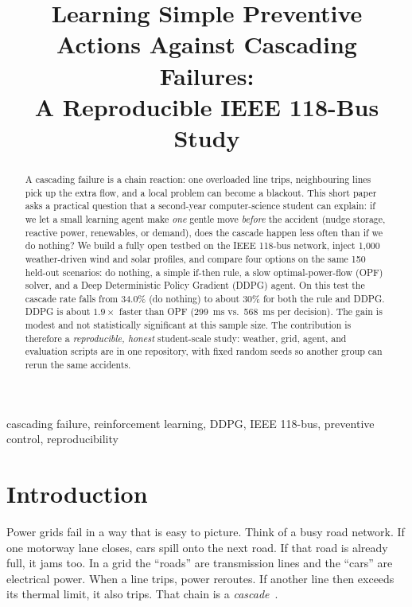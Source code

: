\documentclass[conference]{IEEEtran}
\begin{document}
\title{Learning Simple Preventive Actions Against Cascading Failures:\\
A Reproducible IEEE 118-Bus Study}

\author{
}

\maketitle

\begin{abstract}
A cascading failure is a chain reaction: one overloaded line trips, neighbouring lines pick up the extra flow, and a local problem can become a blackout. This short paper asks a practical question that a second-year computer-science student can explain: if we let a small learning agent make \emph{one} gentle move \emph{before} the accident (nudge storage, reactive power, renewables, or demand), does the cascade happen less often than if we do nothing? We build a fully open testbed on the IEEE 118-bus network, inject 1{,}000 weather-driven wind and solar profiles, and compare four options on the same 150 held-out scenarios: do nothing, a simple if-then rule, a slow optimal-power-flow (OPF) solver, and a Deep Deterministic Policy Gradient (DDPG) agent. On this test the cascade rate falls from 34.0\% (do nothing) to about 30\% for both the rule and DDPG. DDPG is about $1.9\times$ faster than OPF (299~ms vs.\ 568~ms per decision). The gain is modest and not statistically significant at this sample size. The contribution is therefore a \emph{reproducible, honest} student-scale study: weather, grid, agent, and evaluation scripts are in one repository, with fixed random seeds so another group can rerun the same accidents.
\end{abstract}

\begin{IEEEkeywords}
cascading failure, reinforcement learning, DDPG, IEEE 118-bus, preventive control, reproducibility
\end{IEEEkeywords}

\section{Introduction}

Power grids fail in a way that is easy to picture. Think of a busy road network. If one motorway lane closes, cars spill onto the next road. If that road is already full, it jams too. In a grid the ``roads'' are transmission lines and the ``cars'' are electrical power. When a line trips, power reroutes. If another line then exceeds its thermal limit, it also trips. That chain is a \emph{cascade}~\cite{b1}.
\end{document}
